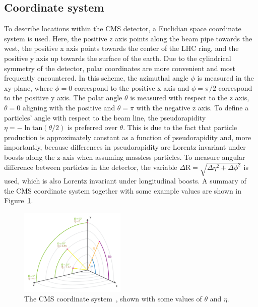 \subsection{Coordinate system}
To describe locations within the CMS detector, a Euclidian space coordinate system is used. Here, the positive z axis points along the beam pipe towards the west, the positive x axis points towards the center of the LHC ring, and the positive y axis up towards the surface of the earth. Due to the cylindrical symmetry of the detector, polar coordinates are more convenient and most frequently encountered. In this scheme, the azimuthal angle $\phi$ is measured in the xy-plane, where $\phi=0$ correspond to the positive x axis and $\phi=\pi/2$ correspond to the positive y axis. The polar angle $\theta$ is measured with respect to the z axis, $\theta=0$ aligning with the positive and $\theta=\pi$ with the negative z axis. To define a particles' angle with respect to the beam line, the pseudorapidity $\eta = -\ln{}\textrm{tan}(\theta/2)$ is preferred over $\theta$. This is due to the fact that particle production is approximately constant as a function of pseudorapidity and, more importantly, because differences in pseudorapidity are Lorentz invariant under boosts along the z-axis when assuming massless particles.
To measure angular difference between particles in the detector, the variable $\Delta \textrm{R}=\sqrt{\Delta \eta^2+\Delta \phi^2}$ is used, which is also Lorentz invariant under longitudinal boosts. A summary of the CMS coordinate system together with some example values are shown in Figure~\ref{fig:cms:coordinates}.
\begin{figure}[h] 
    \centering
    \includegraphics[width=0.45\textwidth]{figures/cms/img_cms_coordinates.png}
    \caption{The CMS coordinate system~\cite{Lenzi:2013xpa}, shown with some values of $\theta$ and $\eta$.}
    \label{fig:cms:coordinates}
\end{figure}

